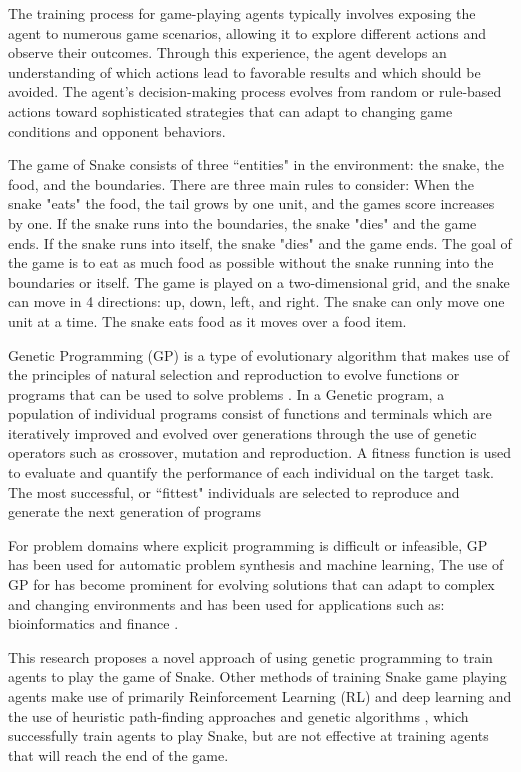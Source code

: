 \documentclass[a4paper,12pt]{article}
\begin{document}
The training process for game-playing agents typically involves exposing the agent to numerous game scenarios, allowing it to explore different actions and observe their outcomes. 
Through this experience, the agent develops an understanding of which actions lead to favorable results and which should be avoided. 
The agent's decision-making process evolves from random or rule-based actions toward sophisticated strategies that can adapt to changing game conditions and opponent behaviors.~\cite{AImodern}

The game of Snake consists of three ``entities" in the environment: the snake, the food, and the boundaries. 
There are three main rules to consider: When the snake "eats" the food, the tail grows by one unit, and the games score increases by one. 
If the snake runs into the boundaries, the snake "dies" and the game ends. If the snake runs into itself, the snake "dies" and the game ends. 
The goal of the game is to eat as much food as possible without the snake running into the boundaries or itself. 
The game is played on a two-dimensional grid, and the snake can move in 4 directions: up, down, left, and right. 
The snake can only move one unit at a time. The snake eats food as it moves over a food item.

Genetic Programming (GP) is a type of evolutionary algorithm that makes use of the principles of natural selection and reproduction
to evolve functions or programs that can be used to solve problems \cite{Koza}. In a Genetic program, a population of individual programs
consist of functions and terminals which are iteratively improved and evolved over generations through the use of genetic operators such as
crossover, mutation and reproduction. A fitness function is used to evaluate and quantify the performance of each individual on the target task.
The most successful, or ``fittest" individuals are selected to reproduce and generate the next generation of programs\cite{GPTut}

For problem domains where explicit programming is difficult or infeasible, GP has been used for automatic problem synthesis and machine learning,
The use of GP for has become prominent for evolving solutions that can adapt to complex and changing environments and has been used for applications
such as: bioinformatics \cite{Bioinformatics} and finance \cite{finance}.


This research proposes a novel approach of using genetic programming to train agents to play the game of Snake. 
Other methods of training Snake game playing agents make use of primarily Reinforcement Learning (RL) \cite{Reinforcement1} and deep learning \cite{Reinforcement4} and the use of heuristic path-finding approaches \cite{Heuristic1} and genetic algorithms \cite{EA2}, 
which successfully train agents to play Snake, but are not effective at training agents that will reach the end of the game.
\end{document}
